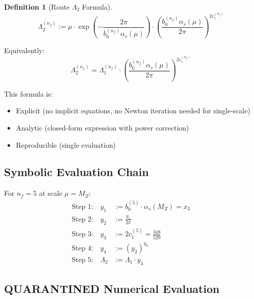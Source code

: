 \documentclass[11pt,a4paper]{article}
\theoremstyle{definition}
\newtheorem{definition}{Definition}[section]
\begin{document}
\begin{definition}[Route $\Lambda_2$ Formula]
\label{def:route-lambda2}
\begin{equation}
\label{eq:lambda2-formula}
\boxed{\Lambda_2^{(n_f)} := \mu \cdot \exp\left(-\frac{2\pi}{b_0^{(n_f)} \alpha_s(\mu)}\right)
  \cdot \left(\frac{b_0^{(n_f)} \alpha_s(\mu)}{2\pi}\right)^{2c_1^{(n_f)}}}
\end{equation}

Equivalently:
\begin{equation}
\label{eq:lambda2-alt}
\boxed{\Lambda_2^{(n_f)} = \Lambda_1^{(n_f)} \cdot \left(\frac{b_0^{(n_f)} \alpha_s(\mu)}{2\pi}\right)^{2c_1^{(n_f)}}}
\end{equation}

This formula is:
\begin{itemize}
  \item Explicit (no implicit equations, no Newton iteration needed for single-scale)
  \item Analytic (closed-form expression with power correction)
  \item Reproducible (single evaluation)
\end{itemize}
\end{definition}

\subsection{Symbolic Evaluation Chain}
\label{subsec:lambda2-chain}

For $n_f = 5$ at scale $\mu = M_Z$:
\begin{align}
\label{eq:lambda2-step1}
\text{Step 1:} \quad y_1 &:= b_0^{(5)} \cdot \alpha_s(M_Z) = x_3 \\
\label{eq:lambda2-step2}
\text{Step 2:} \quad y_2 &:= \frac{y_1}{2\pi} \\
\label{eq:lambda2-step3}
\text{Step 3:} \quad y_3 &:= 2 c_1^{(5)} = \frac{348}{529} \\
\label{eq:lambda2-step4}
\text{Step 4:} \quad y_4 &:= (y_2)^{y_3} \\
\label{eq:lambda2-step5}
\text{Step 5:} \quad \Lambda_2 &:= \Lambda_1 \cdot y_4
\end{align}

\subsection{QUARANTINED Numerical Evaluation}
\label{subsec:lambda2-numerical}
\end{document}
